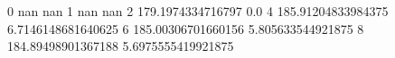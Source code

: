 0 nan nan
1 nan nan
2 179.1974334716797 0.0
4 185.91204833984375 6.7146148681640625
6 185.00306701660156 5.805633544921875
8 184.89498901367188 5.6975555419921875
